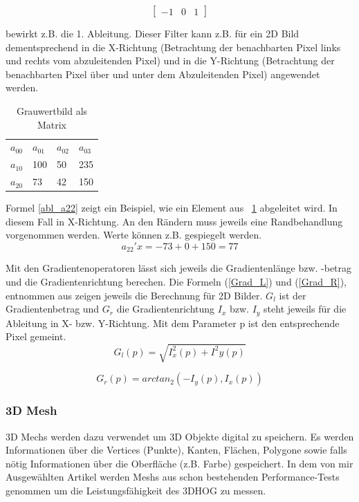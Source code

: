 \begin{equation}
\label{Abl_Maske}
\begin{bmatrix}
-1 & 0 & 1
\end{bmatrix}
\end{equation}

bewirkt z.B. die 1. Ableitung. Dieser Filter kann z.B. für ein 2D Bild dementsprechend in die X-Richtung (Betrachtung der benachbarten Pixel links und rechts vom abzuleitenden Pixel) und in die Y-Richtung (Betrachtung der benachbarten Pixel über und unter dem Abzuleitenden Pixel) angewendet werden.  

\begin{table}[]
	\centering
	\caption{Grauwertbild als Matrix}
	\label{GrauwertMat}
	\begin{tabular}{llll}
		$a_{00}$ & $a_{01}$ & $a_{02}$ & $a_{03}$ \\
		$a_{10}$ & 100    & 50     & 235     \\
		$a_{20}$ & 73     & 42     & 150      \\
	\end{tabular}
\end{table}

Formel \ref{abl_a22} zeigt ein Beispiel, wie ein Element aus \tablename~\ref{GrauwertMat} abgeleitet wird. In diesem Fall in X-Richtung. An den Rändern muss jeweils eine Randbehandlung vorgenommen werden. Werte können z.B. gespiegelt werden.
\begin{equation}
\label{abl_a22}
a_{22}'x = -73 + 0 +150 = 77
\end{equation}

Mit den Gradientenoperatoren lässt sich jeweils die Gradientenlänge bzw. -betrag und die Gradientenrichtung berechen. Die Formeln (\ref{Grad_L}) und (\ref{Grad_R}), entnommen aus \cite{Priese15} zeigen jeweils die Berechnung für 2D Bilder. $G_l$ ist der Gradientenbetrag und $G_r$ die Gradientenrichtung $I_x$ bzw. $I_y$ steht jeweils für die Ableitung in X- bzw. Y-Richtung. Mit dem Parameter p ist den entsprechende Pixel gemeint.
\begin{equation}
\label{Grad_L}
G_l(p) = \sqrt{I^2_x(p)+ I^2 y(p)}
\end{equation}

\begin{equation}
\label{Grad_R}
G_r(p) = arctan_2(- I_y(p),I_x(p))
\end{equation}


\subsubsection{3D Mesh}
3D Mechs werden dazu verwendet um 3D Objekte digital zu speichern. Es werden Informationen über die Vertices (Punkte), Kanten, Flächen, Polygone sowie falls nötig Informationen über die Oberfläche (z.B. Farbe) gespeichert. In dem von mir Ausgewählten Artikel \cite{scherer2010histograms} werden Meshs aus schon bestehenden Performance-Tests genommen um die Leistungsfähigkeit des 3DHOG zu messen.